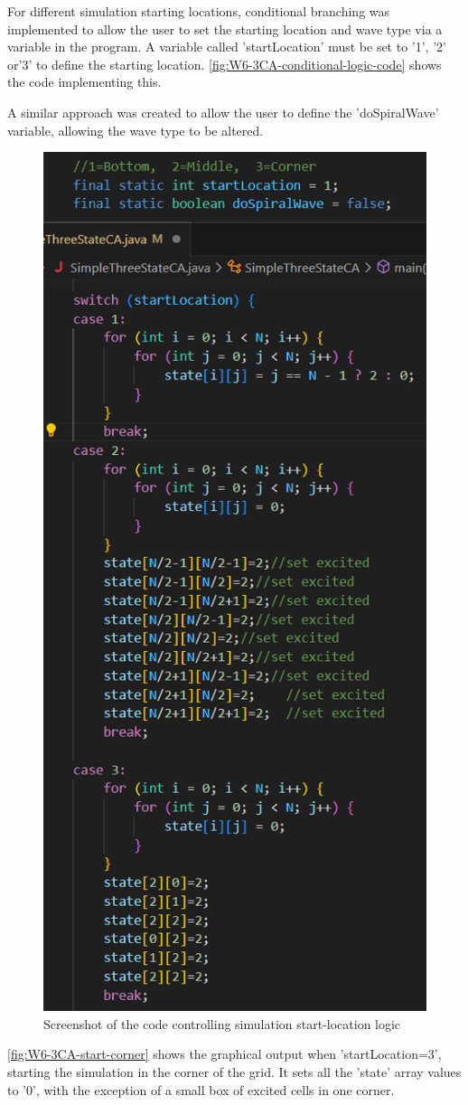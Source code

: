 For different simulation starting locations, conditional branching was implemented to allow the user to set the starting location and wave type via a variable in the program. A variable called 'startLocation' must be set to '1', '2' or'3' to define the starting location. \autoref{fig:W6-3CA-conditional-logic-code} shows the code implementing this.

A similar approach was created to allow the user to define the 'doSpiralWave' variable, allowing the wave type to be altered.

\begin{figure}[H] 
    \centering
    \includegraphics[width=0.6\columnwidth]{Figures/Week 6/3stateCA-plane-logic-code.png}
    \caption{Screenshot of the code controlling simulation start-location logic}
    \label{fig:W6-3CA-conditional-logic-code}
\end{figure}

\newpage

\autoref{fig:W6-3CA-start-corner} shows the graphical output when 'startLocation=3', starting the simulation in the corner of the grid. It sets all the 'state' array values to '0', with the exception of a small box of excited cells in one corner.

